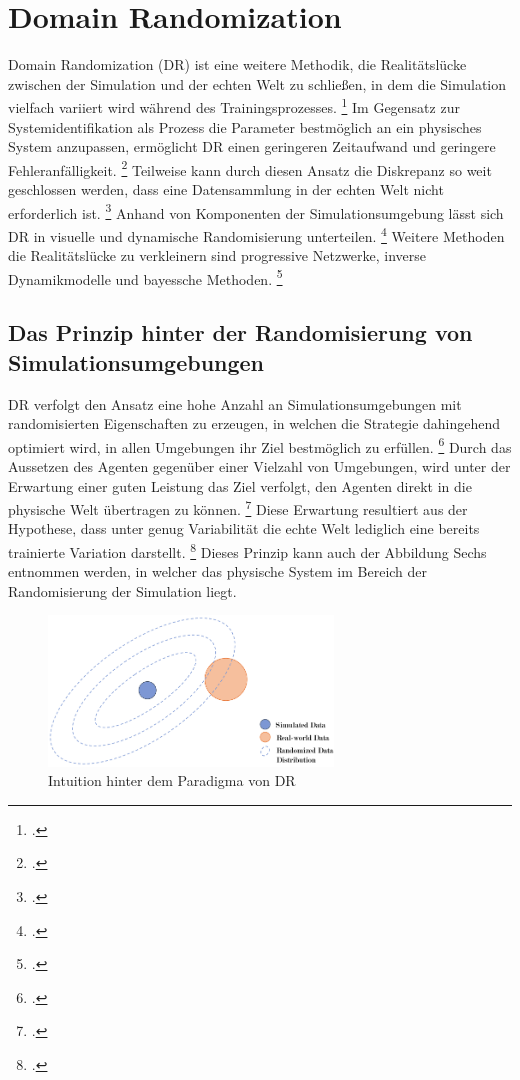 \section{Domain Randomization}

Domain Randomization (DR) ist eine weitere Methodik, die Realitätslücke zwischen der Simulation und der echten Welt zu schließen, in dem die Simulation vielfach variiert wird während des Trainingsprozesses. \footcite[Vgl.][S. 3]{Bharadhwaj.2019}
Im Gegensatz zur Systemidentifikation als Prozess die Parameter bestmöglich an ein physisches System anzupassen, ermöglicht DR einen geringeren Zeitaufwand und geringere Fehleranfälligkeit. \footcite[Vgl.][S. 1]{Tobin.2017}
Teilweise kann durch diesen Ansatz die Diskrepanz so weit geschlossen werden, dass eine Datensammlung in der echten Welt nicht erforderlich ist. \footcite[Vgl.][S. 2]{Molchanov.2019}
Anhand von Komponenten der Simulationsumgebung lässt sich DR in visuelle und dynamische Randomisierung unterteilen. \footcite[Vgl.][S. 5]{Zhao.2020}
Weitere Methoden die Realitätslücke zu verkleinern sind progressive Netzwerke, inverse Dynamikmodelle und bayessche Methoden. \footcite[Vgl.][S. 2]{Chen.2021}

\subsection{Das Prinzip hinter der Randomisierung von Simulationsumgebungen}

DR verfolgt den Ansatz eine hohe Anzahl an Simulationsumgebungen mit randomisierten Eigenschaften zu erzeugen, in welchen die Strategie dahingehend optimiert wird, in allen Umgebungen ihr Ziel bestmöglich zu erfüllen. \footcite[Vgl.][S. 1]{Hsu.2023}
Durch das Aussetzen des Agenten gegenüber einer Vielzahl von Umgebungen, wird unter der Erwartung einer guten Leistung das Ziel verfolgt, den Agenten direkt in die physische Welt übertragen zu können. \footcite[Vgl.][S. 2]{Chen.2021}
Diese Erwartung resultiert aus der Hypothese, dass unter genug Variabilität die echte Welt lediglich eine bereits trainierte Variation darstellt. \footcite[Vgl.][S. 1]{Tobin.2017}
Dieses Prinzip kann auch der Abbildung Sechs entnommen werden, in welcher das physische System im Bereich der Randomisierung der Simulation liegt. 

\begin{figure}[htb]
    \centering
    \includegraphics[height=4cm]{lib/graphics/Domain_randomization.png}
    \caption[Intuition hinter dem Paradigma von DR]{Intuition hinter dem Paradigma von DR\footnotemark}
    \label{abb:Domain_randomization}
\end{figure}


